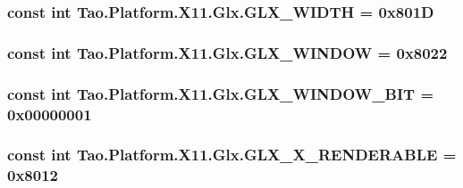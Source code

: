\label{class_tao_1_1_platform_1_1_x11_1_1_glx_a2893e772610e2ca4b80c46216137bef2}
\hypertarget{class_tao_1_1_platform_1_1_x11_1_1_glx_a20f2b47a4e7d251d68992f8af2250b30}{
\subsubsection[{GLX\_\-WIDTH}]{\setlength{\rightskip}{0pt plus 5cm}const int {\bf Tao.Platform.X11.Glx.GLX\_\-WIDTH} = 0x801D}}
\label{class_tao_1_1_platform_1_1_x11_1_1_glx_a20f2b47a4e7d251d68992f8af2250b30}
\hypertarget{class_tao_1_1_platform_1_1_x11_1_1_glx_a6f88ad44e0889a5ad2156f84a70bb493}{
\subsubsection[{GLX\_\-WINDOW}]{\setlength{\rightskip}{0pt plus 5cm}const int {\bf Tao.Platform.X11.Glx.GLX\_\-WINDOW} = 0x8022}}
\label{class_tao_1_1_platform_1_1_x11_1_1_glx_a6f88ad44e0889a5ad2156f84a70bb493}
\hypertarget{class_tao_1_1_platform_1_1_x11_1_1_glx_a276a399a7aaf0d9b0d1c627ec02860b3}{
\subsubsection[{GLX\_\-WINDOW\_\-BIT}]{\setlength{\rightskip}{0pt plus 5cm}const int {\bf Tao.Platform.X11.Glx.GLX\_\-WINDOW\_\-BIT} = 0x00000001}}
\label{class_tao_1_1_platform_1_1_x11_1_1_glx_a276a399a7aaf0d9b0d1c627ec02860b3}
\hypertarget{class_tao_1_1_platform_1_1_x11_1_1_glx_af839e96ef74a4a68ba5f6b93012f804c}{
\subsubsection[{GLX\_\-X\_\-RENDERABLE}]{\setlength{\rightskip}{0pt plus 5cm}const int {\bf Tao.Platform.X11.Glx.GLX\_\-X\_\-RENDERABLE} = 0x8012}}

